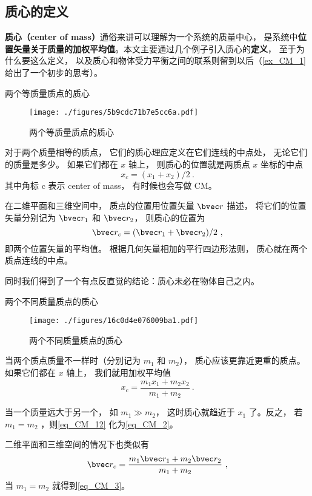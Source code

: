 

\subsection{质心的定义}
\textbf{质心（center of mass）}通俗来讲可以理解为一个系统的质量中心， 是系统中\textbf{位置矢量关于质量的加权平均值}。本文主要通过几个例子引入质心的\textbf{定义}， 至于为什么要这么定义， 以及质心和物体受力平衡之间的联系则留到以后（\autoref{ex_CM_1} 给出了一个初步的思考）。

\begin{example}{两个等质量质点的质心}

\begin{figure}[ht]
\centering
\texttt{[image: ./figures/5b9cdc71b7e5cc6a.pdf]}
\caption{两个等质量质点的质心} \label{fig_CM_4}
\end{figure}
对于两个质量相等的质点， 它们的质心理应定义在它们连线的中点处， 无论它们的质量是多少。 如果它们都在 $x$ 轴上， 则质心的位置就是两质点 $x$ 坐标的中点
\begin{equation}\label{eq_CM_2}
x_c = (x_1 + x_2)/2~.
\end{equation}
其中角标 c 表示 center of mass， 有时候也会写做 CM。

在二维平面和三维空间中， 质点的位置用位置矢量 $\bvec r$ 描述， 将它们的位置矢量分别记为 $\bvec r_1$ 和 $\bvec r_2$， 则质心的位置为
\begin{equation}\label{eq_CM_3}
\bvec r_c = (\bvec r_1 + \bvec r_2)/2~,
\end{equation}
即两个位置矢量的平均值。 根据几何矢量相加的平行四边形法则， 质心就在两个质点连线的中点。

同时我们得到了一个有点反直觉的结论：质心未必在物体自己之内。
\end{example}

\begin{example}{两个不同质量质点的质心}
\begin{figure}[ht]
\centering
\texttt{[image: ./figures/16c0d4e076009ba1.pdf]}
\caption{两个不同质量质点的质心} \label{fig_CM_5}
\end{figure}
当两个质点质量不一样时（分别记为 $m_1$ 和 $m_2$）， 质心应该更靠近更重的质点。 如果它们都在 $x$ 轴上， 我们就用加权平均值
\begin{equation}\label{eq_CM_12}
x_c = \frac{m_1 x_1 + m_2 x_2}{m_1 + m_2}~.
\end{equation}

当一个质量远大于另一个， 如 $m_1 \gg m_2$， 这时质心就趋近于 $x_1$ 了。反之， 若$m_1 = m_2$ ，则\autoref{eq_CM_12} 化为\autoref{eq_CM_2}。

二维平面和三维空间的情况下也类似有
\begin{equation}\label{eq_CM_5}
\bvec r_c = \frac{m_1 \bvec r_1 + m_2 \bvec r_2}{m_1 + m_2}~,
\end{equation}
当 $m_1 = m_2$ 就得到\autoref{eq_CM_3}。
\end{example}

